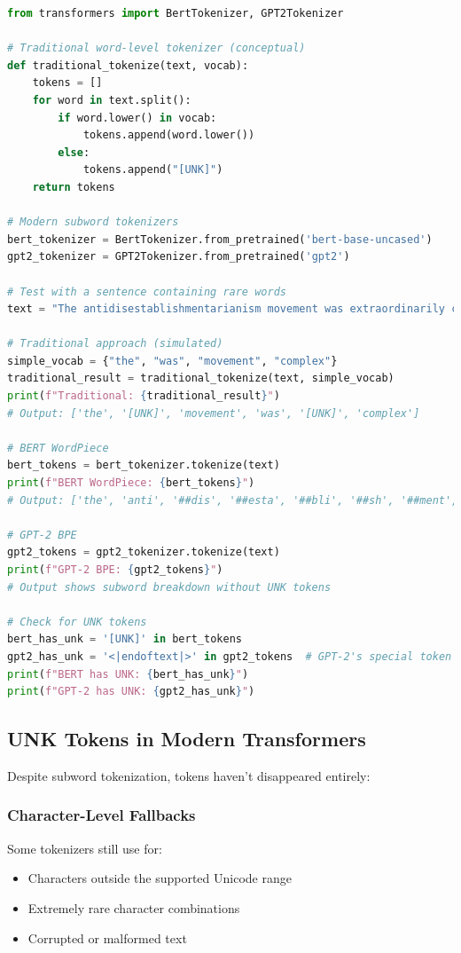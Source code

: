\begin{example}
\begin{lstlisting}[language=Python]
from transformers import BertTokenizer, GPT2Tokenizer

# Traditional word-level tokenizer (conceptual)
def traditional_tokenize(text, vocab):
    tokens = []
    for word in text.split():
        if word.lower() in vocab:
            tokens.append(word.lower())
        else:
            tokens.append("[UNK]")
    return tokens

# Modern subword tokenizers
bert_tokenizer = BertTokenizer.from_pretrained('bert-base-uncased')
gpt2_tokenizer = GPT2Tokenizer.from_pretrained('gpt2')

# Test with a sentence containing rare words
text = "The antidisestablishmentarianism movement was extraordinarily complex"

# Traditional approach (simulated)
simple_vocab = {"the", "was", "movement", "complex"}
traditional_result = traditional_tokenize(text, simple_vocab)
print(f"Traditional: {traditional_result}")
# Output: ['the', '[UNK]', 'movement', 'was', '[UNK]', 'complex']

# BERT WordPiece
bert_tokens = bert_tokenizer.tokenize(text)
print(f"BERT WordPiece: {bert_tokens}")
# Output: ['the', 'anti', '##dis', '##esta', '##bli', '##sh', '##ment', '##arian', '##ism', 'movement', 'was', 'extraordinary', 'complex']

# GPT-2 BPE
gpt2_tokens = gpt2_tokenizer.tokenize(text)
print(f"GPT-2 BPE: {gpt2_tokens}")
# Output shows subword breakdown without UNK tokens

# Check for UNK tokens
bert_has_unk = '[UNK]' in bert_tokens
gpt2_has_unk = '<|endoftext|>' in gpt2_tokens  # GPT-2's special token
print(f"BERT has UNK: {bert_has_unk}")
print(f"GPT-2 has UNK: {gpt2_has_unk}")
\end{lstlisting}
\end{example}

\subsection{UNK Tokens in Modern Transformers}

Despite subword tokenization, \unk{} tokens haven't disappeared entirely:

\subsubsection{Character-Level Fallbacks}
Some tokenizers still use \unk{} for:
\begin{itemize}
\item Characters outside the supported Unicode range
\item Extremely rare character combinations
\item Corrupted or malformed text
\end{itemize}

